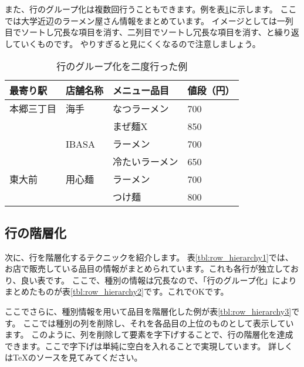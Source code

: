 \documentclass[uplatex,onecolumn,9pt,dvipdfmx]{jsarticle}
\newcommand{\Tref}[1]{表\ref{#1}}
\begin{document}
また、行のグループ化は複数回行うこともできます。例を\Tref{tbl:row_group4}に示します。
ここでは大学近辺のラーメン屋さん情報をまとめています。
イメージとしては一列目でソートし冗長な項目を消す、二列目でソートし冗長な項目を消す、と繰り返していくものです。
やりすぎると見にくくなるので注意しましょう。

\begin{table}[h]
    \centering
    \begin{tabular}{@{}llll@{}} \toprule
        最寄り駅 & 店舗名称 & メニュー品目 & 値段（円） \\ \midrule
        本郷三丁目 & 海手 & なつラーメン & 700 \\
                  &     & まぜ麺X & 850 \\
                  & IBASA & ラーメン & 700 \\
                  &       & 冷たいラーメン & 650 \\
        東大前  & 用心麺 & ラーメン & 700  \\ 
              &         & つけ麺 & 800  \\ \bottomrule   
    \end{tabular}
    \caption{行のグループ化を二度行った例}
    \label{tbl:row_group4}
\end{table}


\subsection{行の階層化}

次に、行を階層化するテクニックを紹介します。
\Tref{tbl:row_hierarchy1}では、お店で販売している品目の情報がまとめられています。これも各行が独立しており、良い表です。
ここで、種別の情報は冗長なので、「行のグループ化」によりまとめたものが\Tref{tbl:row_hierarchy2}です。これでOKです。

ここでさらに、種別情報を用いて品目を階層化した例が\Tref{tbl:row_hierarchy3}です。
ここでは種別の列を削除し、それを各品目の上位のものとして表示しています。
このように、列を削除して要素を字下げすることで、行の階層化を達成できます。ここで字下げは単純に空白を入れることで実現しています。
詳しくはTeXのソースを見てみてください。
\end{document}
